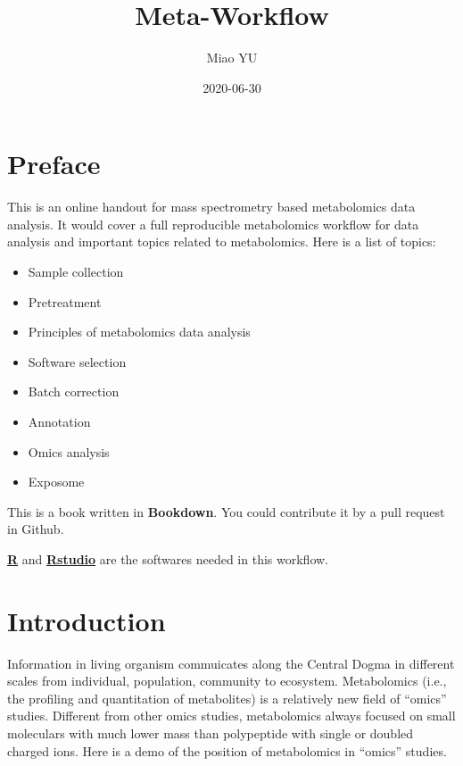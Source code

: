 \documentclass[
]{book}
\title{Meta-Workflow}
\author{Miao YU}
\date{2020-06-30}
\providecommand{\tightlist}{%
  \setlength{\itemsep}{0pt}\setlength{\parskip}{0pt}}
\begin{document}
\maketitle

{
\setcounter{tocdepth}{1}
\tableofcontents
}
\hypertarget{preface}{%
\chapter*{Preface}\label{preface}}

This is an online handout for mass spectrometry based metabolomics data analysis. It would cover a full reproducible metabolomics workflow for data analysis and important topics related to metabolomics. Here is a list of topics:

\begin{itemize}
\tightlist
\item
  Sample collection
\item
  Pretreatment
\item
  Principles of metabolomics data analysis
\item
  Software selection
\item
  Batch correction
\item
  Annotation
\item
  Omics analysis
\item
  Exposome
\end{itemize}

This is a book written in \textbf{Bookdown}. You could contribute it by a pull request in Github.

\href{https://www.r-project.org/}{\textbf{R}} and \href{https://www.rstudio.com/}{\textbf{Rstudio}} are the softwares needed in this workflow.

\hypertarget{introduction}{%
\chapter{Introduction}\label{introduction}}

Information in living organism commuicates along the Central Dogma in different scales from individual, population, community to ecosystem. Metabolomics (i.e., the profiling and quantitation of metabolites) is a relatively new field of ``omics'' studies. Different from other omics studies, metabolomics always focused on small moleculars with much lower mass than polypeptide with single or doubled charged ions. Here is a demo of the position of metabolomics in ``omics'' studies\citep{b.dunn2011}.
\end{document}
